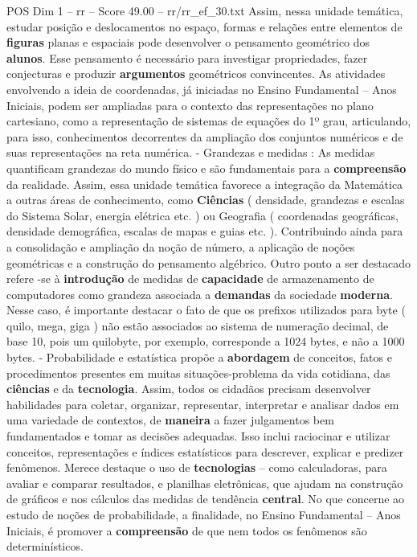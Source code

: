 \begin{textsample}{POS Dim 1 – rr – Score 49.00 – rr/rr\_ef\_30.txt}
Assim, nessa unidade temática, estudar posição e deslocamentos no espaço, formas e relações entre elementos de \textbf{figuras} planas e espaciais pode desenvolver o pensamento geométrico dos \textbf{alunos}.
Esse pensamento é necessário para investigar propriedades, fazer conjecturas e produzir \textbf{argumentos} geométricos convincentes.
As atividades envolvendo a ideia de coordenadas, já iniciadas no Ensino Fundamental – Anos Iniciais, podem ser ampliadas para o contexto das representações no plano cartesiano, como a representação de sistemas de equações do 1º grau, articulando, para isso, conhecimentos decorrentes da ampliação dos conjuntos numéricos e de suas representações na reta numérica. - Grandezas e medidas : As medidas quantificam grandezas do mundo físico e são fundamentais para a \textbf{compreensão} da realidade.
Assim, essa unidade temática favorece a integração da Matemática a outras áreas de conhecimento, como \textbf{Ciências} ( densidade, grandezas e escalas do Sistema Solar, energia elétrica etc. ) ou Geografia ( coordenadas geográficas, densidade demográfica, escalas de mapas e guias etc. ).
Contribuindo ainda para a consolidação e ampliação da noção de número, a aplicação de noções geométricas e a construção do pensamento algébrico.
Outro ponto a ser destacado refere -se à \textbf{introdução} de medidas de \textbf{capacidade} de armazenamento de computadores como grandeza associada a \textbf{demandas} da sociedade \textbf{moderna}.
Nesse caso, é importante destacar o fato de que os prefixos utilizados para byte ( quilo, mega, giga ) não estão associados ao sistema de numeração decimal, de base 10, pois um quilobyte, por exemplo, corresponde a 1024 bytes, e não a 1000 bytes. - Probabilidade e estatística propõe a \textbf{abordagem} de conceitos, fatos e procedimentos presentes em muitas situações-problema da vida cotidiana, das \textbf{ciências} e da \textbf{tecnologia}.
Assim, todos os cidadãos precisam desenvolver habilidades para coletar, organizar, representar, interpretar e analisar dados em uma variedade de contextos, de \textbf{maneira} a fazer julgamentos bem fundamentados e tomar as decisões adequadas.
Isso inclui raciocinar e utilizar conceitos, representações e índices estatísticos para descrever, explicar e predizer fenômenos.
Merece destaque o uso de \textbf{tecnologias} – como calculadoras, para avaliar e comparar resultados, e planilhas eletrônicas, que ajudam na construção de gráficos e nos cálculos das medidas de tendência \textbf{central}.
No que concerne ao estudo de noções de probabilidade, a finalidade, no Ensino Fundamental – Anos Iniciais, é promover a \textbf{compreensão} de que nem todos os fenômenos são determinísticos.

\end{textsample}
